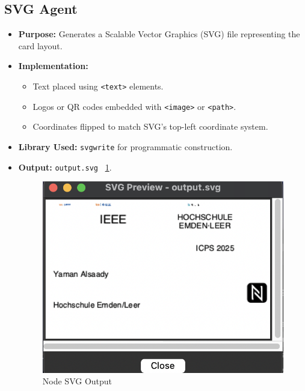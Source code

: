 \subsection{SVG Agent}
\begin{itemize}
	\item \textbf{Purpose:} Generates a Scalable Vector Graphics (SVG) file representing the card layout.
	\item \textbf{Implementation:}
	\begin{itemize}
		\item Text placed using \texttt{<text>} elements.
		\item Logos or QR codes embedded with \texttt{<image>} or \texttt{<path>}.
		\item Coordinates flipped to match SVG’s top-left coordinate system.
	\end{itemize}
	\item \textbf{Library Used:} \texttt{svgwrite} for programmatic construction.
	\item \textbf{Output:} \texttt{output.svg} ~\ref{SVG}.
	
	\begin{figure}
		\begin{center}
			\includegraphics[width=0.6\linewidth]{Images/svg.png}
			\caption{Node SVG Output}
			\label{SVG} 
		\end{center}
	\end{figure}
\end{itemize}

